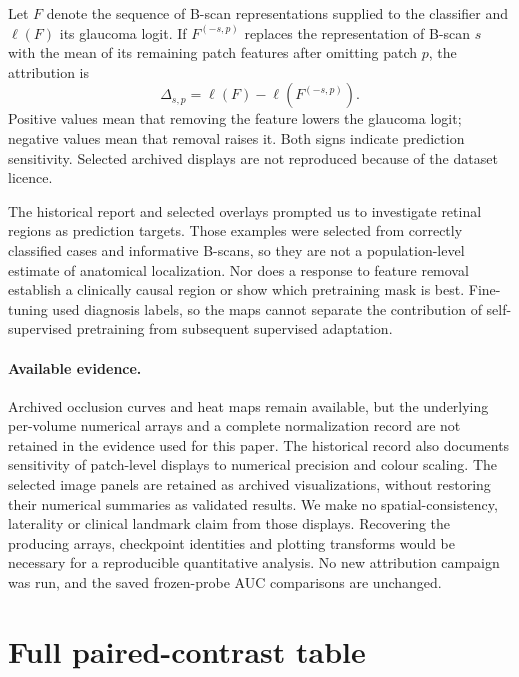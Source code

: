 \documentclass{article}
\begin{document}
Let $F$ denote the sequence of B-scan representations supplied to the
classifier and $\ell(F)$ its glaucoma logit. If $F^{(-s,p)}$ replaces
the representation of B-scan $s$ with the mean of its remaining patch
features after omitting patch $p$, the attribution is
\begin{equation}
 \Delta_{s,p}=\ell(F)-\ell\!\left(F^{(-s,p)}\right).
 \label{eq:occlusion_delta}
\end{equation}
Positive values mean that removing the feature lowers the glaucoma logit;
negative values mean that removal raises it. Both signs indicate
prediction sensitivity. Selected archived displays are not reproduced because
of the dataset licence.

The historical report and selected overlays prompted us to investigate retinal
regions as prediction targets. Those examples were selected from correctly
classified cases and informative B-scans, so they are not a population-level
estimate of anatomical localization. Nor does a response to feature removal
establish a clinically causal region or show which pretraining mask is best.
Fine-tuning used diagnosis labels, so the maps cannot separate the contribution
of self-supervised pretraining from subsequent supervised adaptation.

\paragraph{Available evidence.}
Archived occlusion curves and heat maps remain available, but the underlying
per-volume numerical arrays and a complete normalization record are not
retained in the evidence used for this paper. The historical record also
documents sensitivity of patch-level displays to numerical precision and
colour scaling. The selected image panels are retained as archived
visualizations, without restoring their numerical summaries as validated
results. We make no spatial-consistency, laterality or clinical
landmark claim from those displays. Recovering the producing arrays,
checkpoint identities and plotting transforms would be necessary for a
reproducible quantitative analysis. No new attribution campaign was run,
and the saved frozen-probe AUC comparisons are unchanged.

\section{Full paired-contrast table}
\label{app:contrasts}
\end{document}
